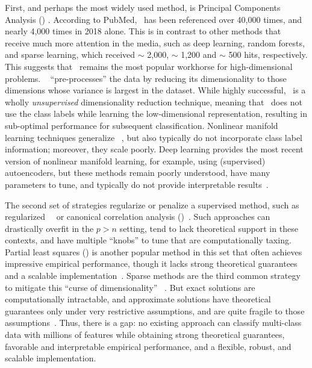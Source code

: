 \documentclass[11pt]{extarticle}
\begin{document}
First, and perhaps the most widely used method, is Principal Components Analysis (\Pca) \cite{Jolliffe1986}. According to PubMed, \Pca~has been referenced over 40,000 times, and nearly 4,000 times in 2018 alone.  This is in contrast to other methods that receive much more attention in the media, such as deep learning, random forests, and sparse learning, which received $\sim$ 2,000, $\sim$ 1,200  and $\sim$ 500 hits, respectively. This suggests that \Pca~remains the most popular workhorse  for high-dimensional problems.  \Pca~ ``pre-processes'' the data by reducing its dimensionality  to those dimensions whose variance is largest in the dataset.  While highly successful, \Pca~is a wholly \emph{unsupervised} dimensionality reduction technique, meaning that \Pca~does not use the class labels while learning the low-dimensional representation, resulting in sub-optimal performance for subsequent classification.  Nonlinear manifold learning techniques generalize \Pca~\cite{Lee2007-bw}, but also typically do not incorporate class label information; moreover, they scale poorly. Deep learning provides the most recent version of nonlinear manifold learning, for example, using (supervised) autoencoders, but these methods remain poorly understood, have many parameters to tune, and typically do not provide interpretable results~\cite{Goodfellow2016-ac}.




The second set of strategies  regularize or penalize a supervised method, such as regularized~\Lda~\cite{Witten2009a} or canonical correlation analysis (\Cca)~\cite{Shin11}.  Such approaches can drastically overfit in the $p>n$ setting, tend to lack theoretical support in these contexts,  and have multiple ``knobs'' to tune that are computationally taxing.
Partial least squares (\Pls) is another popular method in this set that often achieves impressive empirical performance, though it lacks strong theoretical guarantees and a scalable implementation~\cite{Ter_Braak1998-cc, Brereton2014-wr}.
Sparse methods are the third common strategy to mitigate this ``curse of dimensionality''~ \cite{Tibshirani1996,Fan2012a,Hastie2015}. But exact solutions are computationally intractable, and approximate solutions have theoretical guarantees only under very restrictive assumptions, and are quite fragile to those assumptions~\cite{Su2015}.
Thus, there is a gap: no existing  approach  can classify multi-class data with millions of features while  obtaining strong theoretical guarantees,  favorable and interpretable empirical performance, and a flexible, robust, and scalable implementation.
\end{document}
